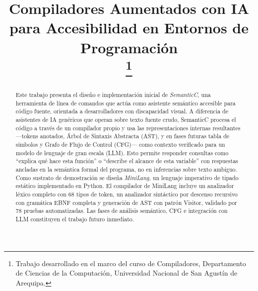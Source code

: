 \documentclass[conference]{IEEEtran}
\begin{document}
\title{Compiladores Aumentados con IA para Accesibilidad en Entornos de Programación\\
\thanks{Trabajo desarrollado en el marco del curso de Compiladores, Departamento de Ciencias de la Computación, Universidad Nacional de San Agustín de Arequipa.}
}

\author{


\and
{}

}

\maketitle

\begin{abstract}

Este trabajo presenta el diseño e implementación inicial de \textit{SemanticC}, una herramienta de línea de comandos que actúa como asistente semántico accesible para código fuente, orientada a desarrolladores con discapacidad visual. A diferencia de asistentes de IA genéricos que operan sobre texto fuente crudo, SemanticC procesa el código a través de un compilador propio y usa las representaciones internas resultantes —tokens anotados, Árbol de Sintaxis Abstracta (AST), y en fases futuras tabla de símbolos y Grafo de Flujo de Control (CFG)— como contexto verificado para un modelo de lenguaje de gran escala (LLM). Esto permite responder consultas como ``explica qué hace esta función'' o ``describe el alcance de esta variable'' con respuestas ancladas en la semántica formal del programa, no en inferencias sobre texto ambiguo. Como sustrato de demostración se diseña \textit{MiniLang}, un lenguaje imperativo de tipado estático implementado en Python. El compilador de MiniLang incluye un analizador léxico completo con 68 tipos de token, un analizador sintáctico por descenso recursivo con gramática EBNF completa y generación de AST con patrón Visitor, validado por 78 pruebas automatizadas. Las fases de análisis semántico, CFG e integración con LLM constituyen el trabajo futuro inmediato.

\end{abstract}
\end{document}
